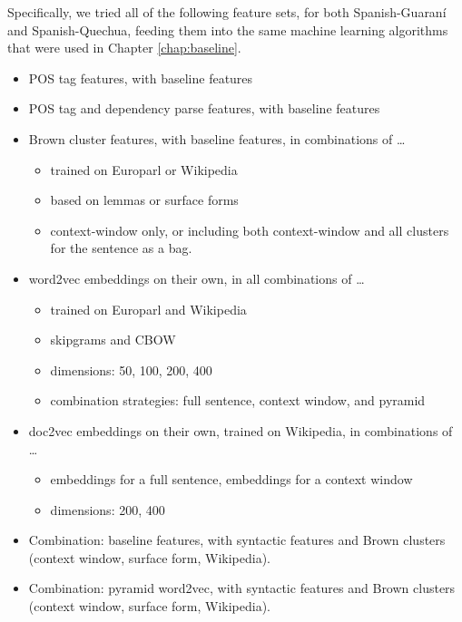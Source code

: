 Specifically, we tried all of the following feature sets, for both
Spanish-Guaraní and Spanish-Quechua, feeding them into the same machine
learning algorithms that were used in Chapter \ref{chap:baseline}.

\begin{itemize}
  \item POS tag features, with baseline features
  \item POS tag and dependency parse features, with baseline features

  \item Brown cluster features, with baseline features, in combinations of
  \dots{}
    \begin{itemize}
      \item trained on Europarl or Wikipedia
      \item based on lemmas or surface forms
      \item context-window only, or including both context-window and all
      clusters for the sentence as a bag.
    \end{itemize}

  \item word2vec embeddings on their own, in all combinations of \dots{}
    \begin{itemize}
      \item trained on Europarl and Wikipedia
      \item skipgrams and CBOW
      \item dimensions: 50, 100, 200, 400
      \item combination strategies: full sentence, context window, and pyramid
    \end{itemize}

  \item doc2vec embeddings on their own, trained on Wikipedia, in combinations
  of \dots{}
    \begin{itemize}
      \item embeddings for a full sentence, embeddings for a context window
      \item dimensions: 200, 400
    \end{itemize}

  \item Combination: baseline features, with syntactic features and
  Brown clusters (context window, surface form, Wikipedia).
  \item Combination: pyramid word2vec, with syntactic features and Brown
  clusters (context window, surface form, Wikipedia).
\end{itemize}

